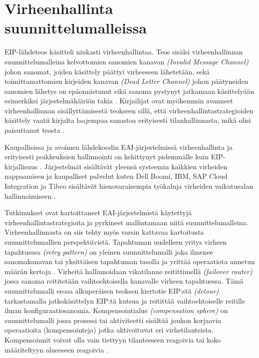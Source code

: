 \section{Virheenhallinta suunnittelumalleissa}
EIP-lähdeteos käsitteli niukasti virheenhallintaa. Teos sisälsi virheenhallinnan suunnittelumalleina kelvottomien sanomien kanavan \textit{(Invalid Message Channel)} johon sanomat, joiden käsittely päättyi virheeseen lähetetään, sekä toimittamattomien kirjeiden kanavan \textit{(Dead Letter Channel)} johon päätyneiden sanomien lähetys on epäonnistunut eikä sanoma pystynyt jatkamaan käsittelyään esimerkiksi järjestelmähäiriön takia \citep{Hohpe2004}.
Kirjailijat ovat myöhemmin avanneet virheenhallinnan sisällyttämisestä teokseen \citep{Hohpe2004} sillä, että virheenhallintastrategioiden käsittely vaatii kirjalta laajempaa sanastoa erityisesti tilanhallinnasta, mikä olisi paisuttanut teosta \citep{Zimmermann2016}.

Kaupallisissa ja avoimen lähdekoodin EAI-järjestelmissä virheenhallinta ja erityisesti poikkeuksien hallinnointi on kehittynyt pidemmälle kuin EIP-kirjallisuus \citep{Ritter2017}. Järjestelmät sisältävät yleensä systeemin kaikkien virheiden nappaamisen ja kaupalliset palvelut kuten Dell Boomi, IBM, SAP Cloud Integration ja Tibco sisältävät hienovaraisempia työkaluja virheiden vaikutusalan hallinnoimiseen \citep{Ritter2017}.

Tutkimukset \citep{ExceptionRitter2014} \citep{ExceptionRitter2016} ovat kartoittaneet EAI-järjestelmistä käytettyjä virheenhallintastrategioita ja pyrkineet mallintamaan niitä suunnittelumalleina. Virheenhallinnasta on siis tehty myös varsin kattavaa kartoitusta suunnittelumallien perspektiivistä.
Tapahtuman uudelleen yritys virheen tapahtuessa \textit{(retry pattern)} on yleinen suunnittelumalli joka ilmenee sanomakanavan tai yksittäisen tapahtuman tasolla ja yrittää operaatiota annetun määrän kertoja \citep{ExceptionRitter2014}.
Virheitä hallinnoidaan vikatilanne reitittimellä \textit{(failover router)} jossa sanoma reititetään vaihtoehtoisella kanavalle virheen tapahtuessa. Tämä suunnittelumalli eroaa alkuperäisen teoksen \citep{Hohpe2004} kiertotie EIP:stä \textit{(detour)} tarkastamalla jatkokäsittelyn EIP:tä kutsua ja reitittää vaihtoehtoiselle reitille ilman konfiguraatiosanomia.
Kompensointialue \textit{(compensation sphere)} on suunnittelumalli jossa prosessi tai aktiviteetti sisältää joukon korjaavia operaatioita (kompensointeja) jotka aktivoituvat eri virhetilanteista. Kompensoinnit voivat olla vain tiettyyn tilanteeseen reagoivia tai koko määriteltyyn alueeseen reagoivia \citep{ExceptionRitter2014}.

